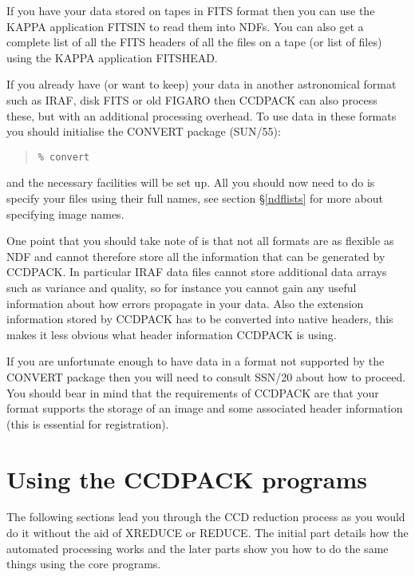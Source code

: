 \documentclass[twoside,11pt]{article}
\newcommand{\hyperref}[4]{#2\ref{#4}#3}
\newcommand{\htmlref}[2]{#1}
\newcommand{\xref}[3]{#1}
\newcommand{\xlabel}[1]{}
\renewcommand{\_}{\texttt{\symbol{95}}}
\newenvironment{myquote}{\begin{quote}\begin{small}}{\end{small}\end{quote}}
\newcommand{\xroutine}[1]{\htmlref{{\sc #1}}{#1}}
\begin{document}
If you have your data stored on tapes in FITS format then you can use
the \xref{KAPPA}{sun95}{} application \xref{FITSIN}{sun95}{FITSIN} to
read them into NDFs. You can also get a complete list of all the FITS
headers of all the files on a tape (or list of files) using the KAPPA
application \xref{FITSHEAD}{sun95}{FITSHEAD}.

If you already have (or want to keep) your data in another
astronomical format such as IRAF, disk FITS or old FIGARO then CCDPACK
can also process these, but with an additional processing overhead. To
use data in these formats you should initialise the CONVERT package
(\xref{SUN/55}{sun55}{}):
\begin{myquote}
\begin{verbatim}
% convert
\end{verbatim}
\end{myquote}
and the necessary facilities will be set up. All you should now need to
do is specify your files using their full names, see
\hyperref{later}{section \S}{}{ndflists} for more about specifying
image names.

One point that you should take note of is that not all formats are as
flexible as NDF and cannot therefore store all the information that
can be generated by CCDPACK. In particular IRAF data files cannot
store additional data arrays such as variance and quality, so for
instance you cannot gain any useful information about how errors
propagate in your data. Also the extension information stored by
CCDPACK has to be converted into native headers, this makes it less
obvious what header information CCDPACK is using.

If you are unfortunate enough to have data in a format not supported by the
CONVERT package then you will need to consult \xref{SSN/20}{ssn20}{}
about how to proceed. You should bear in mind that the requirements
of CCDPACK are that your format supports the storage of an image and
some associated header information (this is essential for registration).

\section{Using the CCDPACK programs\xlabel{DIY}}

The following sections lead you through the CCD reduction process as
you would do it without the aid of \xroutine{XREDUCE} or
\xroutine{REDUCE}.
The initial part details how the automated processing works and the
later parts show you how to do the same things using the core programs.
\end{document}
